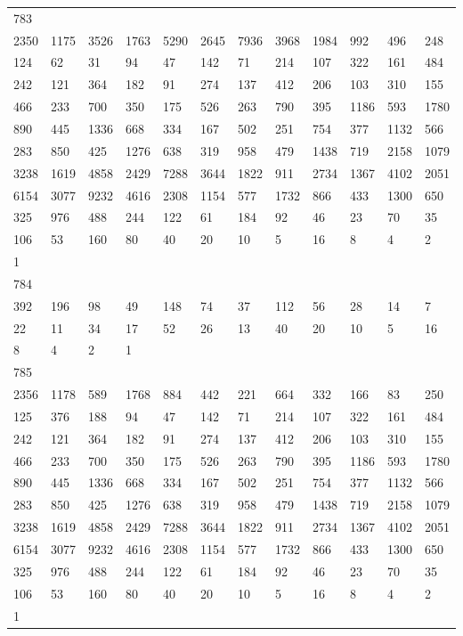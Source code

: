 \begin{longtable}{llllllllllll}
783&&&&&&&&&&&\\
2350& 1175& 3526& 1763& 5290& 2645& 7936& 3968& 1984& 992& 496& 248\\
124& 62& 31& 94& 47& 142& 71& 214& 107& 322& 161& 484\\
242& 121& 364& 182& 91& 274& 137& 412& 206& 103& 310& 155\\
466& 233& 700& 350& 175& 526& 263& 790& 395& 1186& 593& 1780\\
890& 445& 1336& 668& 334& 167& 502& 251& 754& 377& 1132& 566\\
283& 850& 425& 1276& 638& 319& 958& 479& 1438& 719& 2158& 1079\\
3238& 1619& 4858& 2429& 7288& 3644& 1822& 911& 2734& 1367& 4102& 2051\\
6154& 3077& 9232& 4616& 2308& 1154& 577& 1732& 866& 433& 1300& 650\\
325& 976& 488& 244& 122& 61& 184& 92& 46& 23& 70& 35\\
106& 53& 160& 80& 40& 20& 10& 5& 16& 8& 4& 2\\
1& \\

784&&&&&&&&&&&\\
392& 196& 98& 49& 148& 74& 37& 112& 56& 28& 14& 7\\
22& 11& 34& 17& 52& 26& 13& 40& 20& 10& 5& 16\\
8& 4& 2& 1& \\

785&&&&&&&&&&&\\
2356& 1178& 589& 1768& 884& 442& 221& 664& 332& 166& 83& 250\\
125& 376& 188& 94& 47& 142& 71& 214& 107& 322& 161& 484\\
242& 121& 364& 182& 91& 274& 137& 412& 206& 103& 310& 155\\
466& 233& 700& 350& 175& 526& 263& 790& 395& 1186& 593& 1780\\
890& 445& 1336& 668& 334& 167& 502& 251& 754& 377& 1132& 566\\
283& 850& 425& 1276& 638& 319& 958& 479& 1438& 719& 2158& 1079\\
3238& 1619& 4858& 2429& 7288& 3644& 1822& 911& 2734& 1367& 4102& 2051\\
6154& 3077& 9232& 4616& 2308& 1154& 577& 1732& 866& 433& 1300& 650\\
325& 976& 488& 244& 122& 61& 184& 92& 46& 23& 70& 35\\
106& 53& 160& 80& 40& 20& 10& 5& 16& 8& 4& 2\\
1& \\


\end{longtable}
